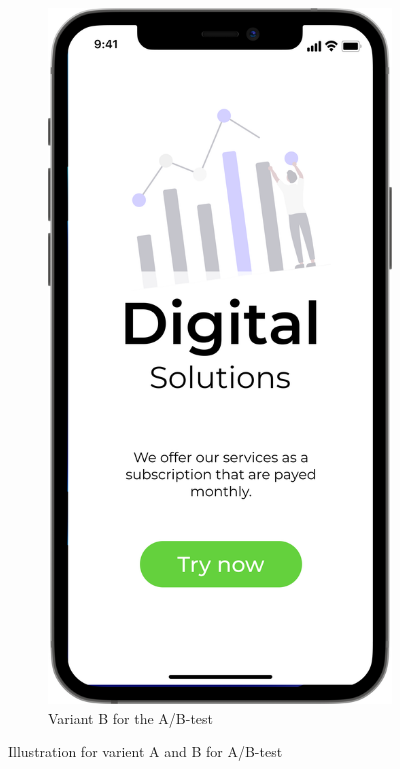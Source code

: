 \begin{figure}[t]
\begin{subfigure}[b]{0.45\textwidth}
    \label{fig:images/A}
  \end{subfigure}
  \hfill
  \begin{subfigure}[b]{0.45\textwidth}
    \includegraphics[width=\linewidth]{images/B.png}
    \caption{Variant B for the A/B-test}
    \label{fig:images/B}
  \end{subfigure}

  \caption{Illustration for varient A and B for A/B-test}
  \label{fig:VariantsForABtest}
\end{figure}

